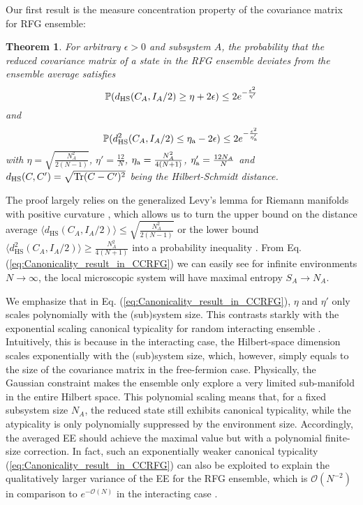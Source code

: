 \documentclass[twocolumn,english,prl,aps,superscriptaddress,amsmath,amssymb,floatfix]{revtex4-2}
\newtheorem{theorem}{Theorem}
\def \Tr {\mathrm{Tr}}
\begin{document}
Our first result is the measure concentration property of the covariance
matrix for RFG ensemble:

\begin{theorem}
For arbitrary $\epsilon>0$ and subsystem $A$, the probability that the reduced covariance matrix of a state in the RFG ensemble deviates from the ensemble average satisfies 
\begin{equation}
\mathbb{P}(d_{\rm HS}(C_{A},
I_{A}/2)\geq\eta+2\epsilon)\leq2e^{-\frac{\epsilon^{2}}{\eta'}}
\label{eq:Canonicality_result_in_CCRFG}
\end{equation}
and
\begin{equation}
\mathbb{P}(d_{\rm HS}^2(C_{A},
I_{A}/2)\leq\eta_{\rm a}-2\epsilon)\le 2e^{-\frac{\epsilon^2}{\eta'_{\rm a}}}    
\label{eq:atypicality}
\end{equation}
with $\eta=\sqrt{\frac{N_{A}^{2}}{2(N-1)}}$, 
$\eta'=\frac{12}{N}$, $\eta_{\rm a}=\frac{N_A^2}{4(N+1)}$, $\eta'_{\rm a}=\frac{12N_A}{N}$ and $d_{\rm HS}(C,C')=\sqrt{\Tr(C-C')^2}$ being the Hilbert-Schmidt distance. 
\end{theorem}
The proof largely relies on the generalized Levy's lemma
for Riemann manifolds with positive curvature \citep{measure_concentration1,measure_concentration2,Meckes2019},
which allows us to turn the upper bound on 
the distance average $\langle d_{\mathrm{HS}}(C_{A},I_{A}/2)\rangle\leq\sqrt{\frac{N_A^2}{2(N-1)}}$ or the lower bound $\langle d^2_{\mathrm{HS}}(C_{A},I_{A}/2)\rangle\geq\frac{N_A^2}{4(N+1)}$
into a probability inequality \citep{SM}. 
From Eq. (\ref{eq:Canonicality_result_in_CCRFG}) we can easily see for
infinite environments $N\to\infty$, the local microscopic system will have maximal entropy
$S_{A}\to N_{A}$.

We emphasize that in Eq. (\ref{eq:Canonicality_result_in_CCRFG}),
$\eta$ and $\eta'$ only scales polynomially with the (sub)system size. 
This contrasts starkly with the exponential scaling canonical typicality 
for random interacting 
ensemble \citep{Popescu2006}. 
Intuitively, this is because in the interacting 
case, the 
Hilbert-space dimension scales exponentially with the (sub)system size, 
which, however, simply equals to the size 
of the covariance matrix in the free-fermion case. 
Physically, the Gaussian constraint 
makes the ensemble
only explore a very limited sub-manifold in the entire 
Hilbert space.
This polynomial scaling means that, for a fixed subsystem size $N_A$, the reduced state still exhibits canonical typicality, while the atypicality is only polynomially suppressed by the environment size. Accordingly, the averaged EE should achieve the maximal value but with a polynomial finite-size correction. In fact, such an exponentially weaker canonical typicality (\ref{eq:Canonicality_result_in_CCRFG}) can also be exploited to explain the qualitatively larger variance of the EE for the RFG ensemble, which is $\mathcal{O}(N^{-2})$ 
in comparison to  
$e^{-\mathcal{O}(N)}$ in the interacting case 
\citep{Bianchi2021a,Bianchi2021,SM}.  
\end{document}
